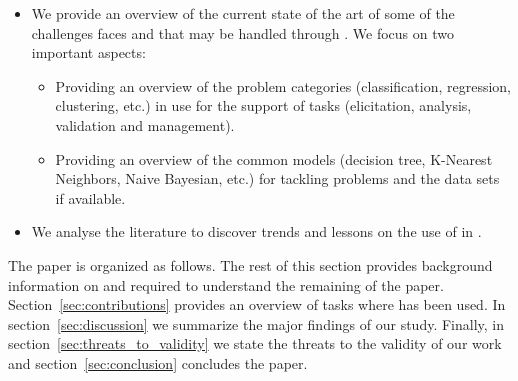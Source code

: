 \begin{itemize}
    \item We provide an overview of the current state of the art of some of the
    challenges \RE faces and that may be handled through \ML. We
    focus on two important aspects:
    \begin{itemize}
        \item Providing an overview of the \ML problem categories
        (classification, regression, clustering, etc.) in use for the support of
        \RE tasks (elicitation, analysis, validation and management).
        \item Providing an overview of the common \ML models (decision tree,
        K-Nearest Neighbors, Naive Bayesian, etc.) for tackling \RE problems and
        the data sets if available.
    \end{itemize}
    \item We analyse the literature to discover trends and lessons on the use of
    \ML in \RE.
\end{itemize}
The paper is organized as follows. The rest of this section provides
background information on \ML and \RE required to understand the remaining of
the paper. Section~\ref{sec:contributions} provides an overview of \RE tasks
where \ML has been used. In section~\ref{sec:discussion} we summarize the major
findings of our study. Finally, in section~\ref{sec:threats_to_validity} we
state the threats to the validity of our work and section~\ref{sec:conclusion}
concludes the paper.



